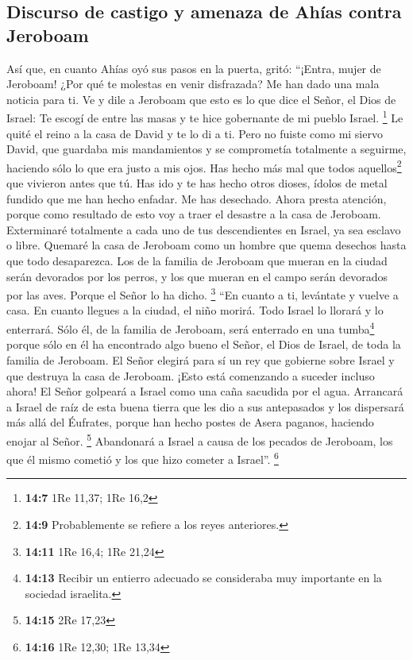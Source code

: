 \hypertarget{discurso-de-castigo-y-amenaza-de-ahuxedas-contra-jeroboam}{%
\subsection{Discurso de castigo y amenaza de Ahías contra
Jeroboam}\label{discurso-de-castigo-y-amenaza-de-ahuxedas-contra-jeroboam}}

 Así que, en cuanto Ahías oyó sus pasos en la puerta,
gritó: ``¡Entra, mujer de Jeroboam! ¿Por qué te molestas en venir
disfrazada? Me han dado una mala noticia para ti.  Ve y
dile a Jeroboam que esto es lo que dice el Señor, el Dios de Israel: Te
escogí de entre las masas y te hice gobernante de mi pueblo Israel.
\footnote{\textbf{14:7} 1Re 11,37; 1Re 16,2}  Le quité el
reino a la casa de David y te lo di a ti. Pero no fuiste como mi siervo
David, que guardaba mis mandamientos y se comprometía totalmente a
seguirme, haciendo sólo lo que era justo a mis ojos.  Has
hecho más mal que todos aquellos\footnote{\textbf{14:9} Probablemente se
  refiere a los reyes anteriores.} que vivieron antes que tú. Has ido y
te has hecho otros dioses, ídolos de metal fundido que me han hecho
enfadar. Me has desechado.  Ahora presta atención, porque
como resultado de esto voy a traer el desastre a la casa de Jeroboam.
Exterminaré totalmente a cada uno de tus descendientes en Israel, ya sea
esclavo o libre. Quemaré la casa de Jeroboam como un hombre que quema
desechos hasta que todo desaparezca.  Los de la familia
de Jeroboam que mueran en la ciudad serán devorados por los perros, y
los que mueran en el campo serán devorados por las aves. Porque el Señor
lo ha dicho. \footnote{\textbf{14:11} 1Re 16,4; 1Re 21,24}
 ``En cuanto a ti, levántate y vuelve a casa. En cuanto
llegues a la ciudad, el niño morirá.  Todo Israel lo
llorará y lo enterrará. Sólo él, de la familia de Jeroboam, será
enterrado en una tumba\footnote{\textbf{14:13} Recibir un entierro
  adecuado se consideraba muy importante en la sociedad israelita.}
porque sólo en él ha encontrado algo bueno el Señor, el Dios de Israel,
de toda la familia de Jeroboam.  El Señor elegirá para sí
un rey que gobierne sobre Israel y que destruya la casa de Jeroboam.
¡Esto está comenzando a suceder incluso ahora!  El Señor
golpeará a Israel como una caña sacudida por el agua. Arrancará a Israel
de raíz de esta buena tierra que les dio a sus antepasados y los
dispersará más allá del Éufrates, porque han hecho postes de Asera
paganos, haciendo enojar al Señor. \footnote{\textbf{14:15} 2Re 17,23}
 Abandonará a Israel a causa de los pecados de Jeroboam,
los que él mismo cometió y los que hizo cometer a Israel''. \footnote{\textbf{14:16}
  1Re 12,30; 1Re 13,34}

